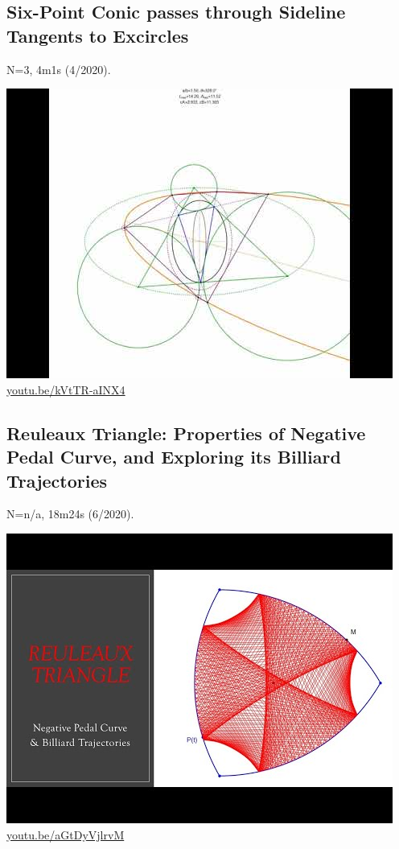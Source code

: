 \documentclass[12pt]{amsart}
\begin{document}
\subsection{Six-Point Conic passes through Sideline Tangents to Excircles}
\label{vid:kVtTR-aINX4}
\noindent N=3, 4m1s (4/2020). 
\begin{center}\includegraphics[width=.5\textwidth]{pics/kVtTR-aINX4.jpg} \\ 
\href{https://youtu.be/kVtTR-aINX4}{\url{youtu.be/kVtTR-aINX4}}\end{center}
% 

\subsection{Reuleaux Triangle: Properties of Negative Pedal Curve, and Exploring its Billiard Trajectories}
\label{vid:aGtDyVjlrvM}
\noindent N=n/a, 18m24s (6/2020). 
\begin{center}\includegraphics[width=.5\textwidth]{pics/aGtDyVjlrvM.jpg} \\ 
\href{https://youtu.be/aGtDyVjlrvM}{\url{youtu.be/aGtDyVjlrvM}}\end{center}
% 
\end{document}
